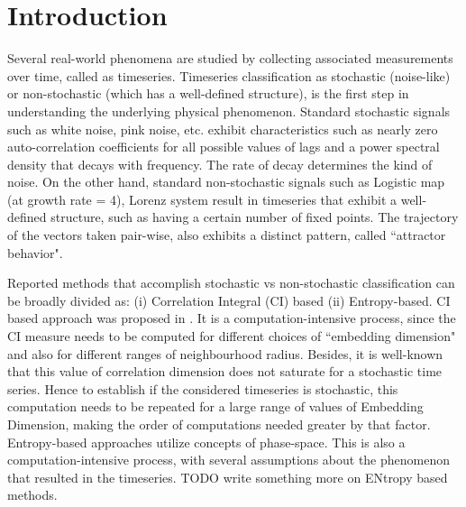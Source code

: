 \documentclass[journal]{IEEEtran}
\begin{document}
	\section{Introduction}
	Several real-world phenomena are studied by collecting associated measurements over time, called as timeseries. Timeseries classification as stochastic (noise-like) or non-stochastic (which has a well-defined structure), is the first step in understanding the underlying physical phenomenon. Standard stochastic signals such as white noise, pink noise, etc. exhibit characteristics such as nearly zero auto-correlation coefficients for all possible values of lags and a power spectral density that decays with frequency. The rate of decay determines the kind of noise. On the other hand, standard non-stochastic signals such as Logistic map (at growth rate = 4), Lorenz system result in timeseries that exhibit a well-defined structure, such as having a certain number of fixed points. The trajectory of the vectors taken  pair-wise, also exhibits a distinct pattern, called ``attractor behavior".
	
	
	Reported methods that accomplish stochastic vs non-stochastic classification can be broadly divided as: (i) Correlation Integral (CI) based (ii) Entropy-based. CI based approach was proposed in \cite{CIGRacia}. It is a computation-intensive process, since the CI measure needs to be computed for different choices of ``embedding dimension" and also for different ranges of neighbourhood radius. Besides, it is well-known that this value of correlation dimension does not saturate for a stochastic time series. Hence to establish if the considered timeseries is stochastic, this computation needs to be repeated for a large range of values of Embedding Dimension, making the order of computations needed greater by that factor. Entropy-based approaches \cite{baretto, russian, splrecent} utilize concepts of phase-space. This is also a computation-intensive process, with several assumptions about the phenomenon that resulted in the timeseries. TODO write something more on ENtropy based methods.
	
\end{document}
